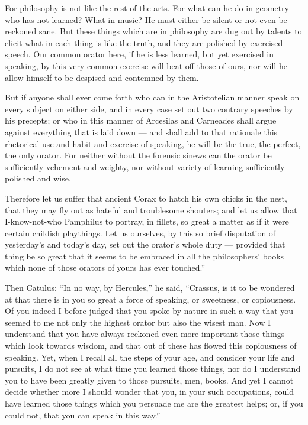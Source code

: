  For philosophy is not like the rest of the arts. For what can he do in geometry who has not learned? What in music? He must either be silent or not even be reckoned sane. But these things which are in philosophy are dug out by talents to elicit what in each thing is like the truth, and they are polished by exercised speech. Our common orator here, if he is less learned, but yet exercised in speaking, by this very common exercise will beat off those of ours, nor will he allow himself to be despised and contemned by them.

 But if anyone shall ever come forth who can in the Aristotelian manner speak on every subject on either side, and in every case set out two contrary speeches by his precepts; or who in this manner of Arcesilas and Carneades shall argue against everything that is laid down — and shall add to that rationale this rhetorical use and habit and exercise of speaking, he will be the true, the perfect, the only orator. For neither without the forensic sinews can the orator be sufficiently vehement and weighty, nor without variety of learning sufficiently polished and wise.

 Therefore let us suffer that ancient Corax to hatch his own chicks in the nest, that they may fly out as hateful and troublesome shouters; and let us allow that I-know-not-who Pamphilus to portray, in fillets, so great a matter as if it were certain childish playthings. Let us ourselves, by this so brief disputation of yesterday's and today's day, set out the orator's whole duty — provided that thing be so great that it seems to be embraced in all the philosophers' books which none of those orators of yours has ever touched.''

 Then Catulus: ``In no way, by Hercules,'' he said, ``Crassus, is it to be wondered at that there is in you so great a force of speaking, or sweetness, or copiousness. Of you indeed I before judged that you spoke by nature in such a way that you seemed to me not only the highest orator but also the wisest man. Now I understand that you have always reckoned even more important those things which look towards wisdom, and that out of these has flowed this copiousness of speaking. Yet, when I recall all the steps of your age, and consider your life and pursuits, I do not see at what time you learned those things, nor do I understand you to have been greatly given to those pursuits, men, books. And yet I cannot decide whether more I should wonder that you, in your such occupations, could have learned those things which you persuade me are the greatest helps; or, if you could not, that you can speak in this way.''


